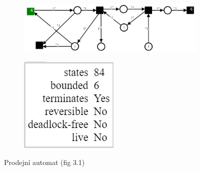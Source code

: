 \documentclass[
  biblatex,
  glossaries,
]{kidiplom}
\begin{document}
\clearpage
\begin{figure}[h]
  \centering
  \begin{subfigure}[h]{0.7\linewidth}
    \includegraphics[width=\linewidth]{net_cooking_vending_machine}
  \end{subfigure}
  \begin{subfigure}[h]{0.2\linewidth}
    \includegraphics[width=\linewidth]{net_cooking_vending_machine_analysis}
  \end{subfigure}
  \caption{Prodejní automat (fig 3.1)}
  \label{fig:síť kniha 1}
\end{figure}
\end{document}
